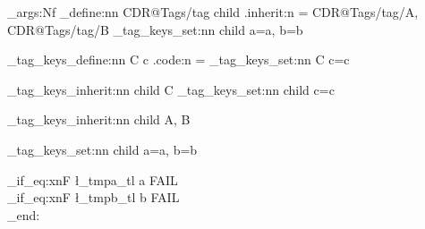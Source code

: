 \exp_args:Nf \keys_define:nn { CDR@Tags/tag } {
  child .inherit:n = { CDR@Tags/tag/A, CDR@Tags/tag/B}
}
\CDR_tag_keys_set:nn { child } { a=a, b=b }

\CDR_tag_keys_define:nn { C } { c .code:n =  }
\CDR_tag_keys_set:nn { C } { c=c }




\CDR_tag_keys_inherit:nn { child } { C }
\CDR_tag_keys_set:nn { child } { c=c }

\CDR_tag_keys_inherit:nn { child } { A, B }

\CDR_tag_keys_set:nn { child } { a=a, b=b }


\tl_if_eq:xnF { \l_tmpa_tl } { a } { FAIL \\ }
\tl_if_eq:xnF { \l_tmpb_tl } { b } { FAIL \\ }
\group_end:
\ExplSyntaxOff
